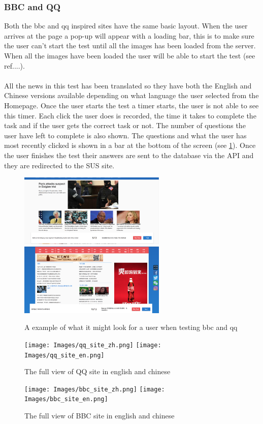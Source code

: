 \subsubsection{BBC and QQ}
Both the bbc and qq inspired sites have the same basic layout. When the user arrives at the page a pop-up will appear with a loading bar, this is to make sure the user can't start the test until all the images has been loaded from the server. When all the images have been loaded the user will be able to start the test (see ref....).  
\\\\
All the news in this test has been translated so they have both the English and Chinese versions available depending on what language the user selected from the Homepage. Once the user starts the test a timer starts, the user is not able to see this timer. Each click the user does is recorded, the time it takes to complete the task and if the user gets the correct task or not. The number of questions the user have left to complete is also shown. The questions and what the user has most recently clicked is shown in a bar at the bottom of the screen (see \ref{fig:user_view}). Once the user finishes the test their answers are sent to the database via the API and they are redirected to the SUS site. 
\begin{figure}[h]
	\centering
	\includegraphics[width=70mm]{Images/view_bbc.png}
	\includegraphics[width=70mm]{Images/view_qq.png}
	\decoRule
	\caption[Users View]{A example of what it might look for a user when testing bbc and qq}
	\label{fig:user_view}
\end{figure}
\begin{figure}[h]
	\centering
	\texttt{[image: Images/qq\_site\_zh.png]}
	\texttt{[image: Images/qq\_site\_en.png]}
	\decoRule
	\caption[QQ]{The full view of QQ site in english and chinese}
	\label{fig:qq_site}
\end{figure}
\begin{figure}[h]
	\centering
	\texttt{[image: Images/bbc\_site\_zh.png]}
	\texttt{[image: Images/bbc\_site\_en.png]}
	\decoRule
	\caption[BBC]{The full view of BBC site in english and chinese}
	\label{fig:bbc_site}
\end{figure}


